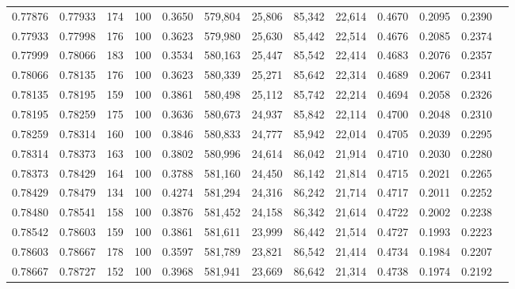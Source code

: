 \begin{tabular}{rrrrrrrrrrrrr}
0.77876 & 0.77933 &   174 & 100 &                                     0.3650 & 579,804 &  25,806 &  85,342 &  22,614 & 0.4670 & 0.2095 & 0.2390 \\
0.77933 & 0.77998 &   176 & 100 &                                     0.3623 & 579,980 &  25,630 &  85,442 &  22,514 & 0.4676 & 0.2085 & 0.2374 \\
0.77999 & 0.78066 &   183 & 100 &                                     0.3534 & 580,163 &  25,447 &  85,542 &  22,414 & 0.4683 & 0.2076 & 0.2357 \\
0.78066 & 0.78135 &   176 & 100 &                                     0.3623 & 580,339 &  25,271 &  85,642 &  22,314 & 0.4689 & 0.2067 & 0.2341 \\
0.78135 & 0.78195 &   159 & 100 &                                     0.3861 & 580,498 &  25,112 &  85,742 &  22,214 & 0.4694 & 0.2058 & 0.2326 \\
0.78195 & 0.78259 &   175 & 100 &                                     0.3636 & 580,673 &  24,937 &  85,842 &  22,114 & 0.4700 & 0.2048 & 0.2310 \\
0.78259 & 0.78314 &   160 & 100 &                                     0.3846 & 580,833 &  24,777 &  85,942 &  22,014 & 0.4705 & 0.2039 & 0.2295 \\
0.78314 & 0.78373 &   163 & 100 &                                     0.3802 & 580,996 &  24,614 &  86,042 &  21,914 & 0.4710 & 0.2030 & 0.2280 \\
0.78373 & 0.78429 &   164 & 100 &                                     0.3788 & 581,160 &  24,450 &  86,142 &  21,814 & 0.4715 & 0.2021 & 0.2265 \\
0.78429 & 0.78479 &   134 & 100 &                                     0.4274 & 581,294 &  24,316 &  86,242 &  21,714 & 0.4717 & 0.2011 & 0.2252 \\
0.78480 & 0.78541 &   158 & 100 &                                     0.3876 & 581,452 &  24,158 &  86,342 &  21,614 & 0.4722 & 0.2002 & 0.2238 \\
0.78542 & 0.78603 &   159 & 100 &                                     0.3861 & 581,611 &  23,999 &  86,442 &  21,514 & 0.4727 & 0.1993 & 0.2223 \\
0.78603 & 0.78667 &   178 & 100 &                                     0.3597 & 581,789 &  23,821 &  86,542 &  21,414 & 0.4734 & 0.1984 & 0.2207 \\
0.78667 & 0.78727 &   152 & 100 &                                     0.3968 & 581,941 &  23,669 &  86,642 &  21,314 & 0.4738 & 0.1974 & 0.2192 \\

\end{tabular}
